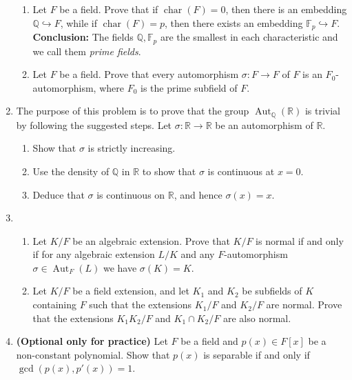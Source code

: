 \documentclass[12pt,
psamsfonts]{amsart}
\theoremstyle{remark}
\theoremstyle{definition}
\newcommand{\R}{\mathbb{R}\xspace}
\newcommand{\Q}{\mathbb{Q}\xspace}
\newcommand{\F}{\mathbb{F}\xspace}
\DeclareMathOperator{\ch}{char}
\DeclareMathOperator{\Aut}{Aut}
\numberwithin{equation}{section}
\begin{document}
\begin{enumerate}
\begin{enumerate}
\item Let $F$ be a field. Prove that if $\ch(F)=0$, then there is an embedding $\Q\hookrightarrow F$, while if $\ch(F)=p$, then there exists an embedding $\F_p\hookrightarrow F$. \\
\textbf{Conclusion:} The fields $\Q,\F_p$ are the smallest in each characteristic and we call them \textit{prime fields}. 
\item Let $F$ be a field. Prove that every automorphism $\sigma:F\to F$ of $F$ is an $F_0$-automorphism, where $F_0$ is the prime subfield of $F$. 
\end{enumerate}
\medskip

\item  The purpose of this problem is to prove that the group $\Aut_\Q(\R)$ is trivial by following the suggested steps. Let $\sigma:\R\to\R$ be an automorphism of $\R$.
\begin{enumerate}
\item  Show that $\sigma$ is strictly increasing. 
\item Use the density of $\Q$ in $\R$ to show that $\sigma$ is continuous at $x=0$. 
\item Deduce that $\sigma$ is continuous on $\R$, and hence $\sigma(x)=x$.  
\end{enumerate}

\medskip
\item \begin{enumerate}
\item Let $K/F$ be an algebraic extension. Prove that $K/F$ is normal if and only if for any algebraic extension $L/K$ and any $F$-automorphism $\sigma\in\Aut_F(L)$ we have $\sigma(K)=K$. 
\item Let $K/F$ be a field extension, and let $K_1$ and $K_2$ be subfields of $K$ containing $F$ such that the extensions $K_1/F$ and $K_2/F$ are normal. Prove that the extensions $K_1K_2/F$ and $K_1\cap K_2/F$ are also normal. \\
\end{enumerate} 
\item \textbf{(Optional only for practice)} Let $F$ be a field and $p(x)\in F[x]$ be a non-constant polynomial. Show that $p(x)$ is separable if and only if $\gcd(p(x),p'(x))=1$.\\




\end{enumerate}
\end{document}
